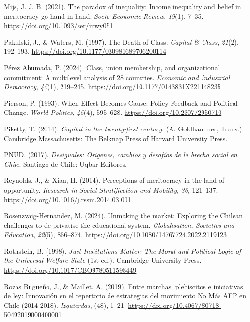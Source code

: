 \documentclass[
  12pt,
]{article}
\newlength{\cslhangindent}
\newenvironment{CSLReferences}[2] %
 {\begin{list}{}{%
  \setlength{\itemindent}{0pt}
  \setlength{\leftmargin}{0pt}
  \setlength{\parsep}{0pt}
  \ifodd #1
   \setlength{\leftmargin}{\cslhangindent}
   \setlength{\itemindent}{-1\cslhangindent}
  \fi
  \setlength{\itemsep}{#2\baselineskip}}}
 {\end{list}}
\begin{document}
\begin{CSLReferences}{1}{0}
Mijs, J. J. B. (2021). The paradox of inequality: Income inequality and
belief in meritocracy go hand in hand. \emph{Socio-Economic Review},
\emph{19}(1), 7--35. \url{https://doi.org/10.1093/ser/mwy051}

Pakulski, J., \& Waters, M. (1997). The {Death} of {Class}.
\emph{Capital \& Class}, \emph{21}(2), 192--193.
\url{https://doi.org/10.1177/030981689706200114}

Pérez Ahumada, P. (2024). Class, union membership, and organizational
commitment: {A} multilevel analysis of 28 countries. \emph{Economic and
Industrial Democracy}, \emph{45}(1), 219--245.
\url{https://doi.org/10.1177/0143831X221148235}

Pierson, P. (1993). When {Effect Becomes Cause}: {Policy Feedback} and
{Political Change}. \emph{World Politics}, \emph{45}(4), 595--628.
\url{https://doi.org/10.2307/2950710}

Piketty, T. (2014). \emph{Capital in the twenty-first century}. (A.
Goldhammer, Trans.). Cambridge Massachusetts: The Belknap Press of
Harvard University Press.

PNUD. (2017). \emph{Desiguales: {Origenes}, cambios y desafíos de la
brecha social en {Chile}}. Santiago de Chile: Uqbar Editores.

Reynolds, J., \& Xian, H. (2014). Perceptions of meritocracy in the land
of opportunity. \emph{Research in Social Stratification and Mobility},
\emph{36}, 121--137. \url{https://doi.org/10.1016/j.rssm.2014.03.001}

Rosenzvaig-Hernandez, M. (2024). Unmaking the market: Exploring the
{Chilean} challenges to de-privatise the educational system.
\emph{Globalisation, Societies and Education}, \emph{22}(5), 856--874.
\url{https://doi.org/10.1080/14767724.2022.2119123}

Rothstein, B. (1998). \emph{Just {Institutions Matter}: {The Moral} and
{Political Logic} of the {Universal Welfare State}} (1st ed.). Cambridge
University Press. \url{https://doi.org/10.1017/CBO9780511598449}

Rozas Bugueño, J., \& Maillet, A. (2019). Entre marchas, plebiscitos e
iniciativas de ley: Innovación en el repertorio de estrategias del
movimiento {No Más AFP} en {Chile} (2014-2018). \emph{Izquierdas}, (48),
1--21. \url{https://doi.org/10.4067/S0718-50492019000400001}


\end{CSLReferences}
\end{document}
